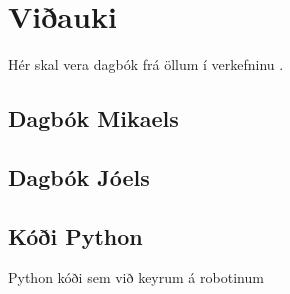 \section{Viðauki}
Hér skal vera dagbók frá öllum í verkefninu .
\subsection{Dagbók Mikaels}
\begingroup
\obeylines

\endgroup
\subsection{Dagbók Jóels}
\begingroup
\obeylines

\endgroup
\subsection{Kóði Python}
Python kóði sem við keyrum á robotinum
\begingroup

\endgroup